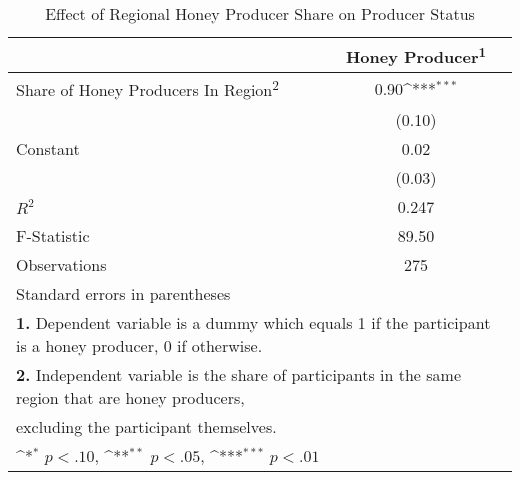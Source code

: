 \begin{table}[htbp]\centering \small
\def\sym#1{\ifmmode^{#1}\else\(^{#1}\)\fi}
\caption{Effect of Regional Honey Producer Share on Producer Status \label{table_IV}}
\begin{tabular}{l*{1}{c}}
\toprule
                    &Honey Producer\textsuperscript{1}         \\
\midrule
Share of Honey Producers In Region\textsuperscript{2}&        0.90\sym{***}\\
                    &      (0.10)         \\
\addlinespace
Constant            &        0.02         \\
                    &      (0.03)         \\
\midrule
\(R^{2}\)           &       0.247         \\
F-Statistic         &       89.50         \\
Observations        &         275         \\
\bottomrule
\multicolumn{2}{l}{\footnotesize Standard errors in parentheses}\\
\multicolumn{2}{l}{\footnotesize \textbf{1.} Dependent variable is a dummy which equals 1 if the participant is a honey producer, 0 if otherwise.}\\
\multicolumn{2}{l}{\footnotesize \textbf{2.} Independent variable is the share of participants in the same region that are honey producers,}\\
\multicolumn{2}{l}{\footnotesize excluding the participant themselves.}\\
\multicolumn{2}{l}{\footnotesize \sym{*} \(p<.10\), \sym{**} \(p<.05\), \sym{***} \(p<.01\)}\\
\end{tabular}
\end{table}
